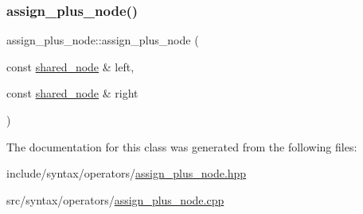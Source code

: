 \subsubsection{\texorpdfstring{assign\+\_\+plus\+\_\+node()}{assign\_plus\_node()}}
{\footnotesize\ttfamily assign\+\_\+plus\+\_\+node\+::assign\+\_\+plus\+\_\+node (\begin{DoxyParamCaption}\item[{const \hyperlink{namespacejawe_a3f307481d921b6cbb50cc8511fc2b544}{shared\+\_\+node} \&}]{left,  }\item[{const \hyperlink{namespacejawe_a3f307481d921b6cbb50cc8511fc2b544}{shared\+\_\+node} \&}]{right }\end{DoxyParamCaption})}



The documentation for this class was generated from the following files\+:\begin{DoxyCompactItemize}
\item 
include/syntax/operators/\hyperlink{assign__plus__node_8hpp}{assign\+\_\+plus\+\_\+node.\+hpp}\item 
src/syntax/operators/\hyperlink{assign__plus__node_8cpp}{assign\+\_\+plus\+\_\+node.\+cpp}\end{DoxyCompactItemize}
